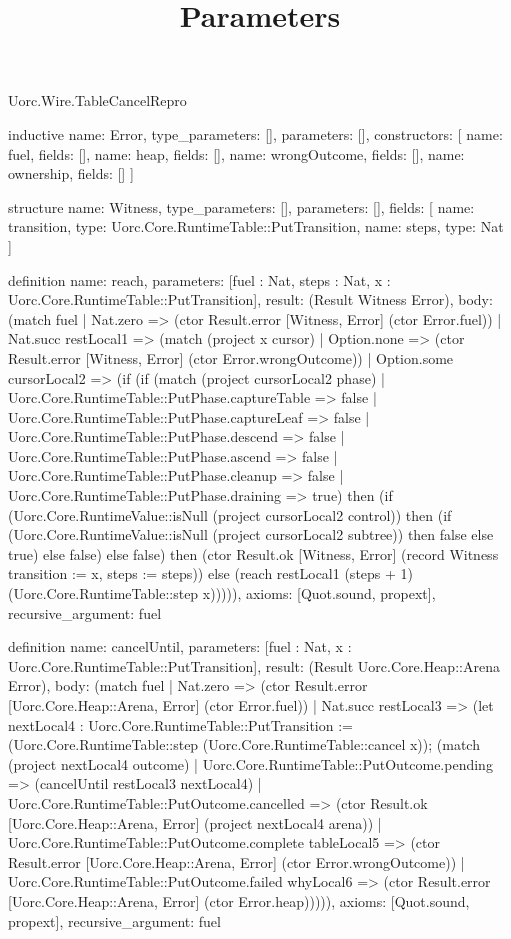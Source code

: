 \begin{lexlean}{Uorc.Wire.TableCancelRepro}
\title{Parameters}
\begin{semanticmodule}
inductive{
  name: Error,
  type_parameters: [],
  parameters: [],
  constructors: [
    {name: fuel, fields: []},
    {name: heap, fields: []},
    {name: wrongOutcome, fields: []},
    {name: ownership, fields: []}
  ]
}

structure{
  name: Witness,
  type_parameters: [],
  parameters: [],
  fields: [
    {name: transition, type: Uorc.Core.RuntimeTable::PutTransition},
    {name: steps, type: Nat}
  ]
}

definition{
  name: reach,
  parameters: [fuel : Nat, steps : Nat, x : Uorc.Core.RuntimeTable::PutTransition],
  result: (Result Witness Error),
  body: (match fuel
    | Nat.zero => (ctor Result.error [Witness, Error] (ctor Error.fuel))
    | Nat.succ restLocal1 => (match (project x cursor)
      | Option.none => (ctor Result.error [Witness, Error] (ctor Error.wrongOutcome))
      | Option.some cursorLocal2 => (if (if (match (project cursorLocal2 phase)
        | Uorc.Core.RuntimeTable::PutPhase.captureTable => false
        | Uorc.Core.RuntimeTable::PutPhase.captureLeaf => false
        | Uorc.Core.RuntimeTable::PutPhase.descend => false
        | Uorc.Core.RuntimeTable::PutPhase.ascend => false
        | Uorc.Core.RuntimeTable::PutPhase.cleanup => false
        | Uorc.Core.RuntimeTable::PutPhase.draining => true) then (if (Uorc.Core.RuntimeValue::isNull (project cursorLocal2 control)) then (if (Uorc.Core.RuntimeValue::isNull (project cursorLocal2 subtree)) then false else true) else false) else false) then (ctor Result.ok [Witness, Error] (record Witness {transition := x, steps := steps})) else (reach restLocal1 (steps + 1) (Uorc.Core.RuntimeTable::step x))))),
  axioms: [Quot.sound, propext],
  recursive_argument: fuel
}

definition{
  name: cancelUntil,
  parameters: [fuel : Nat, x : Uorc.Core.RuntimeTable::PutTransition],
  result: (Result Uorc.Core.Heap::Arena Error),
  body: (match fuel
    | Nat.zero => (ctor Result.error [Uorc.Core.Heap::Arena, Error] (ctor Error.fuel))
    | Nat.succ restLocal3 => (let nextLocal4 : Uorc.Core.RuntimeTable::PutTransition := (Uorc.Core.RuntimeTable::step (Uorc.Core.RuntimeTable::cancel x)); (match (project nextLocal4 outcome)
      | Uorc.Core.RuntimeTable::PutOutcome.pending => (cancelUntil restLocal3 nextLocal4)
      | Uorc.Core.RuntimeTable::PutOutcome.cancelled => (ctor Result.ok [Uorc.Core.Heap::Arena, Error] (project nextLocal4 arena))
      | Uorc.Core.RuntimeTable::PutOutcome.complete tableLocal5 => (ctor Result.error [Uorc.Core.Heap::Arena, Error] (ctor Error.wrongOutcome))
      | Uorc.Core.RuntimeTable::PutOutcome.failed whyLocal6 => (ctor Result.error [Uorc.Core.Heap::Arena, Error] (ctor Error.heap))))),
  axioms: [Quot.sound, propext],
  recursive_argument: fuel
}


\end{semanticmodule}
\end{lexlean}
